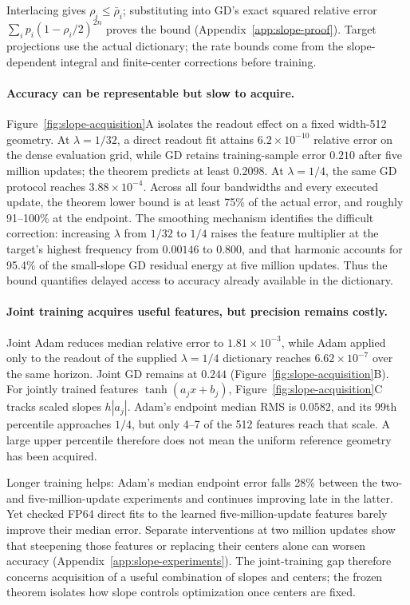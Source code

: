 Interlacing gives $\rho_i\le\bar\rho_i$; substituting into GD's exact squared relative error
$\sum_i p_i(1-\rho_i/2)^{2n}$ proves the bound
(Appendix~\ref{app:slope-proof}). Target projections use the actual
dictionary; the rate bounds come from the slope-dependent integral and
finite-center corrections before training.

\paragraph{Accuracy can be representable but slow to acquire.}
Figure~\ref{fig:slope-acquisition}A isolates the readout effect on a fixed
width-512 geometry. At $\lambda=1/32$, a direct readout fit attains
$6.2\times10^{-10}$ relative error on the dense evaluation grid, while GD
retains training-sample error $0.210$ after five million updates; the theorem
predicts at least $0.2098$.
At $\lambda=1/4$, the same GD protocol reaches $3.88\times10^{-4}$.
Across all four bandwidths and every executed update, the theorem lower
bound is at least 75\% of the actual error, and roughly 91--100\% at the
endpoint. The smoothing mechanism identifies the difficult correction:
increasing $\lambda$ from $1/32$ to $1/4$ raises the feature multiplier at
the target's highest frequency from $0.00146$ to $0.800$, and that harmonic
accounts for 95.4\% of the small-slope GD residual energy at five million
updates. Thus the bound quantifies delayed access to accuracy already
available in the dictionary.

\paragraph{Joint training acquires useful features, but precision remains costly.}
Joint Adam reduces median relative error to $1.81\times10^{-3}$, while Adam
applied only to the readout of the supplied $\lambda=1/4$ dictionary reaches
$6.62\times10^{-7}$ over the same horizon. Joint GD remains at $0.244$
(Figure~\ref{fig:slope-acquisition}B). For jointly trained features
$\tanh(a_jx+b_j)$, Figure~\ref{fig:slope-acquisition}C tracks scaled slopes
$h|a_j|$. Adam's endpoint median RMS is $0.0582$, and its 99th percentile
approaches $1/4$, but only 4--7 of the 512 features reach that scale.
A large upper percentile therefore does not mean the uniform reference
geometry has been acquired.

Longer training helps: Adam's median endpoint error falls 28\% between the
two- and five-million-update experiments and continues improving late in
the latter. Yet checked FP64 direct fits to the learned five-million-update
features barely improve their median error. Separate interventions at two
million updates show that steepening those features or replacing their
centers alone can worsen accuracy (Appendix~\ref{app:slope-experiments}).
The joint-training gap therefore concerns acquisition of a useful combination
of slopes and centers; the frozen theorem isolates how slope controls
optimization once centers are fixed.

